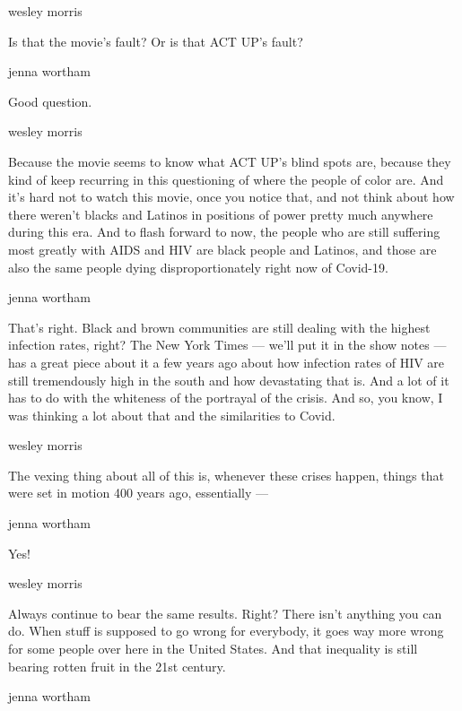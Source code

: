 wesley morris

Is that the movie's fault? Or is that ACT UP's fault?

jenna wortham

Good question.

wesley morris

Because the movie seems to know what ACT UP's blind spots are, because
they kind of keep recurring in this questioning of where the people of
color are. And it's hard not to watch this movie, once you notice that,
and not think about how there weren't blacks and Latinos in positions of
power pretty much anywhere during this era. And to flash forward to now,
the people who are still suffering most greatly with AIDS and HIV are
black people and Latinos, and those are also the same people dying
disproportionately right now of Covid-19.

jenna wortham

That's right. Black and brown communities are still dealing with the
highest infection rates, right? The New York Times --- we'll put it in
the show notes --- has a great piece about it a few years ago about how
infection rates of HIV are still tremendously high in the south and how
devastating that is. And a lot of it has to do with the whiteness of the
portrayal of the crisis. And so, you know, I was thinking a lot about
that and the similarities to Covid.

wesley morris

The vexing thing about all of this is, whenever these crises happen,
things that were set in motion 400 years ago, essentially ---

jenna wortham

Yes!

wesley morris

Always continue to bear the same results. Right? There isn't anything
you can do. When stuff is supposed to go wrong for everybody, it goes
way more wrong for some people over here in the United States. And that
inequality is still bearing rotten fruit in the 21st century.

jenna wortham

